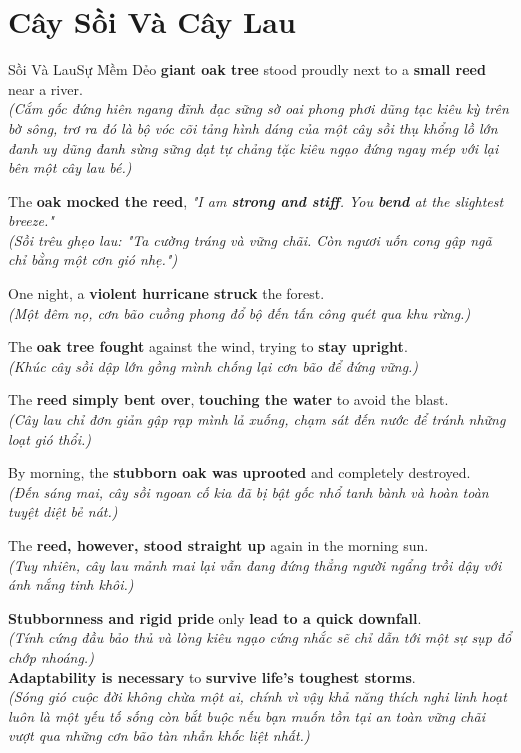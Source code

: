 \section{Cây Sồi Và Cây Lau}
\begin{truyen}{Sồi Và Lau}{Sự Mềm Dẻo}
 \textbf{giant oak tree} stood proudly next to a \textbf{small reed} near a river.\\
\textit{(Cắm gốc đứng hiên ngang đĩnh đạc sững sờ oai phong phơi dũng tạc kiêu kỳ trên bờ sông, trơ ra đó là bộ vóc cõi tảng hình dáng của một cây sồi thụ khổng lồ lớn đanh uy dũng đanh sừng sững dạt tự chảng tặc kiêu ngạo đứng ngay mép với lại bên một cây lau bé.)}

The \textbf{oak mocked the reed}, \textit{"I am \textbf{strong and stiff}. You \textbf{bend} at the slightest breeze."}\\
\textit{(Sồi trêu ghẹo lau: "Ta cường tráng và vững chãi. Còn ngươi uốn cong gập ngã chỉ bằng một cơn gió nhẹ.")}

One night, a \textbf{violent hurricane struck} the forest.\\
\textit{(Một đêm nọ, cơn bão cuồng phong đổ bộ đến tấn công quét qua khu rừng.)}

The \textbf{oak tree fought} against the wind, trying to \textbf{stay upright}.\\
\textit{(Khúc cây sồi dập lớn gồng mình chống lại cơn bão để đứng vững.)}

The \textbf{reed simply bent over}, \textbf{touching the water} to avoid the blast.\\
\textit{(Cây lau chỉ đơn giản gập rạp mình lả xuống, chạm sát đến nước để tránh những loạt gió thổi.)}

By morning, the \textbf{stubborn oak was uprooted} and completely destroyed.\\
\textit{(Đến sáng mai, cây sồi ngoan cố kia đã bị bật gốc nhổ tanh bành và hoàn toàn tuyệt diệt bẻ nát.)}

The \textbf{reed, however, stood straight up} again in the morning sun.\\
\textit{(Tuy nhiên, cây lau mảnh mai lại vẫn đang đứng thẳng người ngẩng trồi dậy với ánh nắng tinh khôi.)}
\end{truyen}

\begin{baihoc}
  \textbf{Stubbornness and rigid pride} only \textbf{lead to a quick downfall}.\\
  \textit{(Tính cứng đầu bảo thủ và lòng kiêu ngạo cứng nhắc sẽ chỉ dẫn tới một sự sụp đổ chớp nhoáng.)}\\
  \textbf{Adaptability is necessary} to \textbf{survive life's toughest storms}.\\
  \textit{(Sóng gió cuộc đời không chừa một ai, chính vì vậy khả năng thích nghi linh hoạt luôn là một yếu tố sống còn bắt buộc nếu bạn muốn tồn tại an toàn vững chãi vượt qua những cơn bão tàn nhẫn khốc liệt nhất.)}
\end{baihoc}

\vspace{0.8cm}
